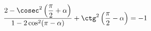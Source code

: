 \begin{ex}[type=prove_identity]
	\begin{condition}
		\( \dfrac{2-\cosec^2\left( \dfrac{\pi}{2}+\alpha \right)}{1-2\cos^2(\pi-\alpha)}+\ctg^2\left( \dfrac{\pi}{2}-\alpha \right)=-1 \)
	\end{condition}
\end{ex}